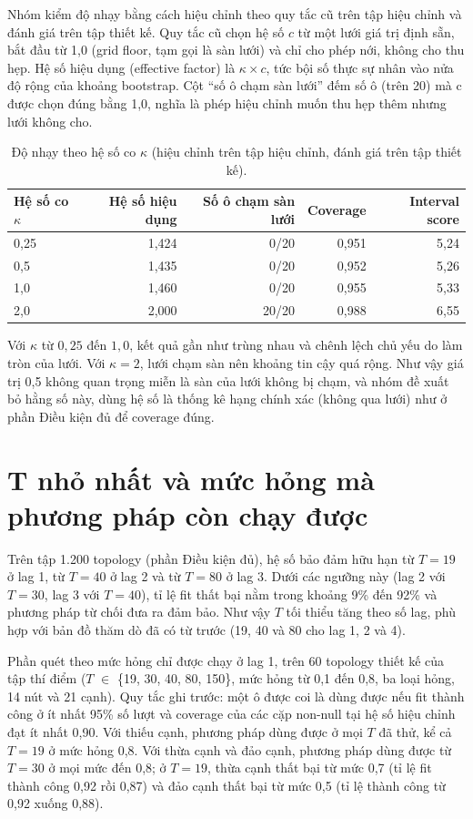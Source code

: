 \documentclass[11pt,a4paper]{article}
\begin{document}
Nhóm kiểm độ nhạy bằng cách hiệu chỉnh theo quy tắc cũ trên tập hiệu chỉnh và đánh giá trên tập thiết kế. Quy tắc cũ chọn hệ số $c$ từ một lưới giá trị định sẵn, bắt đầu từ 1,0 (grid floor, tạm gọi là sàn lưới) và chỉ cho phép nới, không cho thu hẹp. Hệ số hiệu dụng (effective factor) là $\kappa\times c$, tức bội số thực sự nhân vào nửa độ rộng của khoảng bootstrap. Cột ``số ô chạm sàn lưới'' đếm số ô (trên 20) mà c được chọn đúng bằng 1,0, nghĩa là phép hiệu chỉnh muốn thu hẹp thêm nhưng lưới không cho.

\begin{table}[H]
\centering
\caption{Độ nhạy theo hệ số co $\kappa$ (hiệu chỉnh trên tập hiệu chỉnh, đánh giá trên tập thiết kế).}\label{tab:kappa}
{\small
\begin{tabular}{lrrrr}
\toprule
Hệ số co $\kappa$ & Hệ số hiệu dụng & Số ô chạm sàn lưới & Coverage & Interval score \\
\midrule
0,25 & 1,424 & 0/20 & 0,951 & 5,24 \\
0,5 & 1,435 & 0/20 & 0,952 & 5,26 \\
1,0 & 1,460 & 0/20 & 0,955 & 5,33 \\
2,0 & 2,000 & 20/20 & 0,988 & 6,55 \\
\bottomrule
\end{tabular}
}
\end{table}


Với $\kappa$ từ $0{,}25$ đến $1{,}0$, kết quả gần như trùng nhau và chênh lệch chủ yếu do làm tròn của lưới. Với $\kappa=2$, lưới chạm sàn nên khoảng tin cậy quá rộng. Như vậy giá trị 0,5 không quan trọng miễn là sàn của lưới không bị chạm, và nhóm đề xuất bỏ hằng số này, dùng hệ số là thống kê hạng chính xác (không qua lưới) như ở phần Điều kiện đủ để coverage đúng.

\section{T nhỏ nhất và mức hỏng mà phương pháp còn chạy được}

Trên tập 1.200 topology (phần Điều kiện đủ), hệ số bảo đảm hữu hạn từ $T=19$ ở lag 1, từ $T=40$ ở lag 2 và từ $T=80$ ở lag 3. Dưới các ngưỡng này (lag 2 với $T=30$, lag 3 với $T=40$), tỉ lệ fit thất bại nằm trong khoảng 9\% đến 92\% và phương pháp từ chối đưa ra đảm bảo. Như vậy $T$ tối thiểu tăng theo số lag, phù hợp với bản đồ thăm dò đã có từ trước (19, 40 và 80 cho lag 1, 2 và 4).

Phần quét theo mức hỏng chỉ được chạy ở lag 1, trên 60 topology thiết kế của tập thí điểm ($T$ $\in$ \{19, 30, 40, 80, 150\}, mức hỏng từ 0,1 đến 0,8, ba loại hỏng, 14 nút và 21 cạnh). Quy tắc ghi trước: một ô được coi là dùng được nếu fit thành công ở ít nhất 95\% số lượt và coverage của các cặp non-null tại hệ số hiệu chỉnh đạt ít nhất 0,90. Với thiếu cạnh, phương pháp dùng được ở mọi $T$ đã thử, kể cả $T=19$ ở mức hỏng 0,8. Với thừa cạnh và đảo cạnh, phương pháp dùng được từ $T=30$ ở mọi mức đến 0,8; ở $T=19$, thừa cạnh thất bại từ mức 0,7 (tỉ lệ fit thành công 0,92 rồi 0,87) và đảo cạnh thất bại từ mức 0,5 (tỉ lệ thành công từ 0,92 xuống 0,88).
\end{document}
